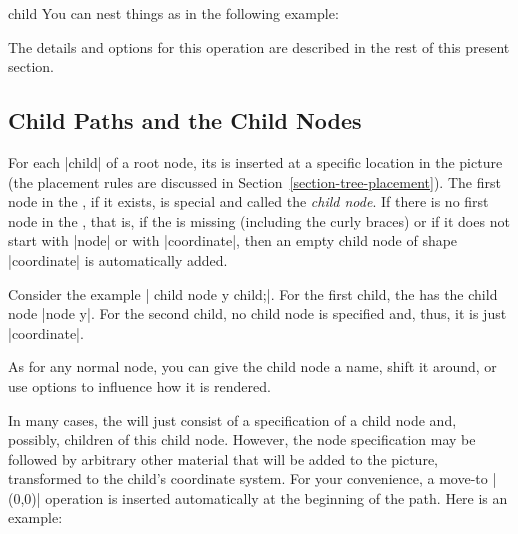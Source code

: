 \begin{pathoperation}{child}{%
    }
  You can nest things as in the following example:
\begin{codeexample}[]
\end{codeexample}

  The details and options for this operation are described in the rest
  of this present section.
\end{pathoperation}



\subsection{Child Paths and the Child Nodes}

For each |child| of a root node, its  is inserted at
a specific location in the picture (the placement rules are discussed
in Section~\ref{section-tree-placement}). The first node in the
, if it exists, is special and called the \emph{child
  node}. If there is no first node in the , that is,
if the  is missing (including the curly braces) or if
it does not start with |node| or with |coordinate|, then an empty
child node of shape |coordinate| is automatically added.

Consider the example | child {node {y}} child;|. For the
first child, the  has the child node |node {y}|. For
the second child, no child node is specified and, thus, it is just
|coordinate|.

As for any normal node, you can give the child node a name, shift it 
around, or use options to influence how it is rendered.
\begin{codeexample}[]
\end{codeexample}

In many cases, the  will just consist of a
specification of a child node and, possibly, children of this child
node. However, the node specification may be followed by arbitrary
other material that will be added to the picture, transformed to the
child's coordinate system. For your convenience, a move-to |(0,0)|
operation is inserted automatically at the beginning of the path. Here
is an example: 

